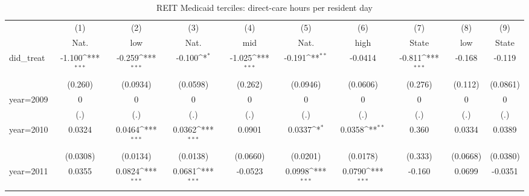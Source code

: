 \begin{table}[htbp]\centering
\def\sym#1{\ifmmode^{#1}\else\(^{#1}\)\fi}
\caption{REIT Medicaid terciles: direct-care hours per resident day}
\begin{tabular}{l*{9}{c}}
\hline\hline
                    &\multicolumn{1}{c}{(1)}&\multicolumn{1}{c}{(2)}&\multicolumn{1}{c}{(3)}&\multicolumn{1}{c}{(4)}&\multicolumn{1}{c}{(5)}&\multicolumn{1}{c}{(6)}&\multicolumn{1}{c}{(7)}&\multicolumn{1}{c}{(8)}&\multicolumn{1}{c}{(9)}\\
                    &\multicolumn{1}{c}{Nat.}&\multicolumn{1}{c}{low}&\multicolumn{1}{c}{Nat.}&\multicolumn{1}{c}{mid}&\multicolumn{1}{c}{Nat.}&\multicolumn{1}{c}{high}&\multicolumn{1}{c}{State}&\multicolumn{1}{c}{low}&\multicolumn{1}{c}{State}\\
\hline
did\_treat           &      -1.100\sym{***}&      -0.259\sym{***}&      -0.100\sym{*}  &      -1.025\sym{***}&      -0.191\sym{**} &     -0.0414         &      -0.811\sym{***}&      -0.168         &      -0.119         \\
                    &     (0.260)         &    (0.0934)         &    (0.0598)         &     (0.262)         &    (0.0946)         &    (0.0606)         &     (0.276)         &     (0.112)         &    (0.0861)         \\
[1em]
year=2009           &           0         &           0         &           0         &           0         &           0         &           0         &           0         &           0         &           0         \\
                    &         (.)         &         (.)         &         (.)         &         (.)         &         (.)         &         (.)         &         (.)         &         (.)         &         (.)         \\
[1em]
year=2010           &      0.0324         &      0.0464\sym{***}&      0.0362\sym{***}&      0.0901         &      0.0337\sym{*}  &      0.0358\sym{**} &       0.360         &      0.0334         &      0.0389         \\
                    &    (0.0308)         &    (0.0134)         &    (0.0138)         &    (0.0660)         &    (0.0201)         &    (0.0178)         &     (0.333)         &    (0.0668)         &    (0.0380)         \\
[1em]
year=2011           &      0.0355         &      0.0824\sym{***}&      0.0681\sym{***}&     -0.0523         &      0.0998\sym{***}&      0.0790\sym{***}&      -0.160         &      0.0699         &     -0.0351         \\

\end{tabular}
\end{table}
